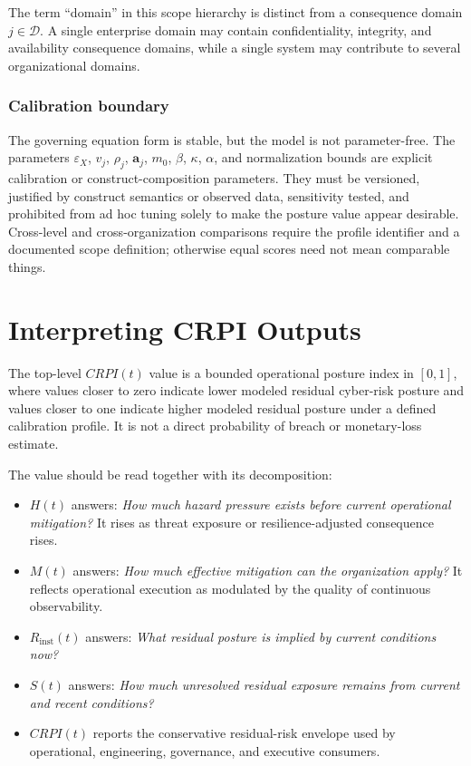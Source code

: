 \documentclass[11pt]{article}
\begin{document}
The term ``domain'' in this scope hierarchy is distinct from a consequence domain
$j\in\mathcal{D}$. A single enterprise domain may contain confidentiality, integrity,
and availability consequence domains, while a single system may contribute to several
organizational domains.

\subsubsection{Calibration boundary}
The governing equation form is stable, but the model is not parameter-free. The
parameters $\varepsilon_X$, $v_j$, $\rho_j$, $\mathbf{a}_j$, $m_0$, $\beta$, $\kappa$, $\alpha$, and
normalization bounds are explicit calibration or construct-composition parameters.
They must be versioned, justified by construct semantics or observed data, sensitivity
tested, and prohibited from ad hoc tuning solely to make the posture value appear
desirable. Cross-level and cross-organization comparisons require the profile identifier
and a documented scope definition; otherwise equal scores need not mean comparable
things.

\section{Interpreting CRPI Outputs}
\label{sec:interpreting}
The top-level $CRPI(t)$ value is a bounded operational posture index in $[0,1]$, where
values closer to zero indicate lower modeled residual cyber-risk posture and values
closer to one indicate higher modeled residual posture under a defined calibration
profile. It is not a direct probability of breach or monetary-loss estimate.

The value should be read together with its decomposition:
\begin{itemize}
  \item $H(t)$ answers: \emph{How much hazard pressure exists before current operational
    mitigation?} It rises as threat exposure or resilience-adjusted consequence rises.
  \item $M(t)$ answers: \emph{How much effective mitigation can the organization apply?}
    It reflects operational execution as modulated by the quality of continuous
    observability.
  \item $R_{\mathrm{inst}}(t)$ answers: \emph{What residual posture is implied by current
    conditions now?}
  \item $S(t)$ answers: \emph{How much unresolved residual exposure remains from current
    and recent conditions?}
  \item $CRPI(t)$ reports the conservative residual-risk envelope used by operational,
    engineering, governance, and executive consumers.
\end{itemize}
\end{document}

